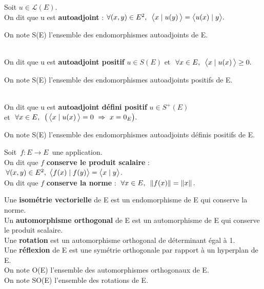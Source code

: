 Soit \(u\in \mathscr{L}(E)\).\vspace{0.1cm}\\
On dit que u est \textbf{autoadjoint} \ssi : \(\forall (x,y)\in E^2,\ \, \bigl\langle x\mid u(y)\, \bigr\rangle=\bigl\langle u(x)\mid y \bigr\rangle.\)\vspace{0.1cm}\\
\begin{small}
    On note S(E) l'ensemble des endomorphismes autoadjoints de E.
\end{small}\vspace{0.5cm}\\
On dit que u est \textbf{autoadjoint positif} \ssi \(u\in S(E)\) et \(\ \forall x\in E,\ \,\bigl\langle x\mid u(x)\, \bigr\rangle\geq 0.\)\vspace{0.1cm}\\
\begin{small}
    On note S\expo{+}(E) l'ensemble des endomorphismes autoadjoints positifs de E.
\end{small}\vspace{0.5cm}\\
On dit que u est \textbf{autoadjoint défini positif} \ssi \(u\in S^+(E)\)\\
et \(\ \forall x\in E,\ \,\bigl(\,\psm{x}{u(x)\,}=0\ \Rightarrow \ x=0_E \bigr).\)\vspace{0.1cm}\\
\begin{small}
    On note S\expo{++}(E) l'ensemble des endomorphismes autoadjoints définis positifs de E.
\end{small}

\vspace{1.5cm}

Soit \(\,f:E\to E\,\) une application.\vspace{0.1cm}\\
On dit que $f$ \textbf{conserve le produit scalaire} \ssi : \(\, \forall (x,y)\in E^2,\ \psm{f(x)}{f(y)}=\psm{x}{y}\).\vspace{0.2cm}\\
On dit que $f$ \textbf{conserve la norme} \ssi : \(\; \forall x\in E,\ \, \left\lVert f(x)\right\rVert=\left\lVert x\right\rVert.\)

\vspace{1.5cm}

\noindent Une \textbf{isométrie vectorielle} de E est un endomorphisme de E qui conserve la norme.\\
Un \textbf{automorphisme orthogonal} de E est un automorphisme de E qui conserve le produit scalaire.\\
Une \textbf{rotation} est un automorphisme orthogonal de déterminant égal à 1.\\
Une \textbf{réflexion} de E est une symétrie orthogonale par rapport à un hyperplan de E.\vspace{0.2cm}\\
On note O(E) l'ensemble des automorphismes orthogonaux de E.\\
On note SO(E) l'ensemble des rotations de E. 

